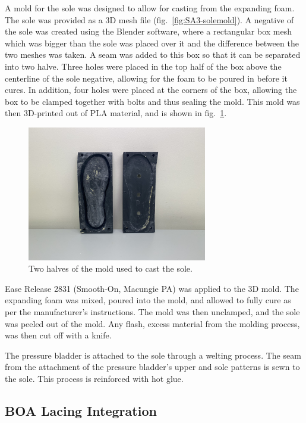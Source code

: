 \documentclass[defaultstyle,11pt]{comps}
\begin{document}
A mold for the sole was designed to allow for casting from the expanding foam.
The sole was provided as a 3D mesh file (fig.~\ref{fig:SA3-solemold}).
A negative of the sole was created using the Blender software, where a rectangular box mesh which was bigger than the sole was placed over it and the difference between the two meshes was taken.
A seam was added to this box so that it can be separated into two halve.
Three holes were placed in the top half of the box above the centerline of the sole negative, allowing for the foam to be poured in before it cures.
In addition, four holes were placed at the corners of the box, allowing the box to be clamped together with bolts and thus sealing the mold.
This mold was then 3D-printed out of PLA material, and is shown in fig.~\ref{fig:SA3-solemoldhalves}.

\begin{figure}
\hypertarget{fig:SA3-solemoldhalves}{%
\centering
\includegraphics[width=0.7\textwidth,height=\textheight]{../fig/SA3/Sole_Mold.jpg}
\caption{Two halves of the mold used to cast the sole.}\label{fig:SA3-solemoldhalves}
}
\end{figure}

Ease Release 2831 (Smooth-On, Macungie PA) was applied to the 3D mold.
The expanding foam was mixed, poured into the mold, and allowed to fully cure as per the manufacturer's instructions.
The mold was then unclamped, and the sole was peeled out of the mold.
Any flash, excess material from the molding process, was then cut off with a knife.

The pressure bladder is attached to the sole through a welting process.
The seam from the attachment of the pressure bladder's upper and sole patterns is sewn to the sole.
This process is reinforced with hot glue.

\hypertarget{boa-lacing-integration}{%
\subsection{BOA Lacing Integration}\label{boa-lacing-integration}}
\end{document}

